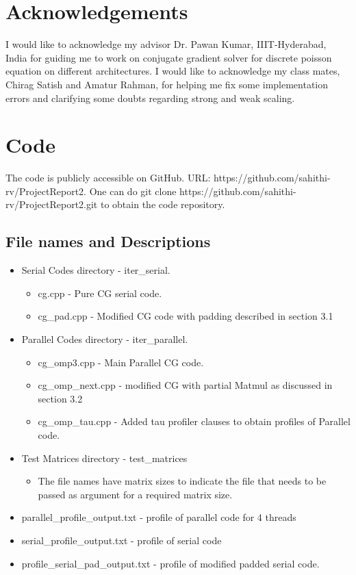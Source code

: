 \documentclass{article}
\begin{document}
\begin{spacing}{1.1}
\newpage
\begin{appendices}

\section{Acknowledgements}

I would like to acknowledge my advisor Dr. Pawan Kumar, IIIT-Hyderabad, India for guiding me to work on conjugate gradient solver for discrete poisson equation on different architectures. I would like to acknowledge my class mates, Chirag Satish and Amatur Rahman, for helping me fix some implementation errors and clarifying some doubts regarding strong and weak scaling.

\section{Code}

The code is publicly accessible on GitHub. URL: https://github.com/sahithi-rv/ProjectReport2.
One can do git clone https://github.com/sahithi-rv/ProjectReport2.git to obtain the code repository.
\subsection{File names and Descriptions}
\begin{itemize}
\item Serial Codes directory - iter\_serial.
\begin{itemize}
    \item cg.cpp - Pure CG serial code.
    \item cg\_pad.cpp - Modified CG code with padding described in section 3.1
\end{itemize}
\item Parallel Codes directory - iter\_parallel.
\begin{itemize}
    \item cg\_omp3.cpp - Main Parallel CG code.
    \item cg\_omp\_next.cpp - modified CG with partial Matmul as discussed in section 3.2
    \item cg\_omp\_tau.cpp - Added tau profiler clauses to obtain profiles of Parallel code.
\end{itemize}
\item Test Matrices directory - test\_matrices
\begin{itemize}
    \item The file names have matrix sizes to indicate the file that needs to be passed as argument for a required matrix size.
\end{itemize}
\item parallel\_profile\_output.txt - profile of parallel code for 4 threads
\item serial\_profile\_output.txt - profile of serial code
\item profile\_serial\_pad\_output.txt - profile of modified padded serial code.


\end{itemize}
\end{appendices}
\end{spacing}
\end{document}
